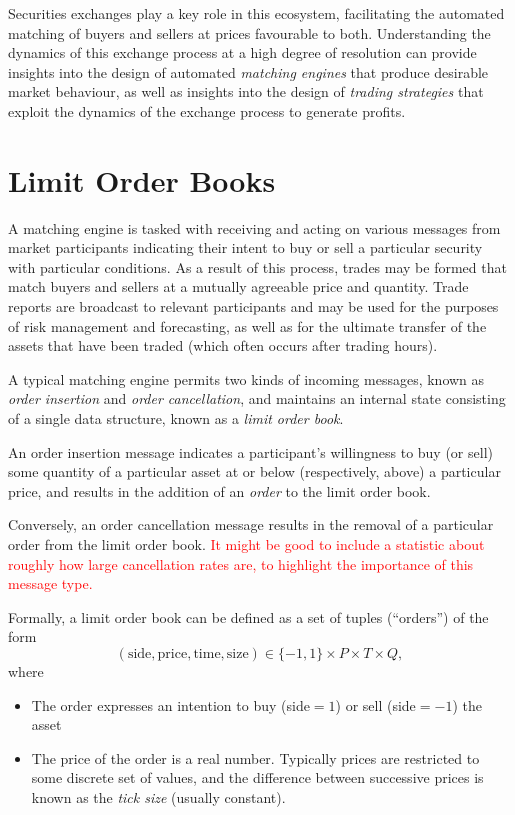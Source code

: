 \documentclass[honours,12pt]{unswthesis}
\numberwithin{equation}{section}
\begin{document}
Securities exchanges play a key role in this ecosystem, facilitating the automated matching of buyers and sellers at prices favourable to both. Understanding the dynamics of this exchange process at a high degree of resolution can provide insights into the design of automated \textit{matching engines} that produce desirable market behaviour, as well as insights into the design of \textit{trading strategies} that exploit the dynamics of the exchange process to generate profits.

\section{Limit Order Books}
A matching engine is tasked with receiving and acting on various messages from market participants indicating their intent to buy or sell a particular security with particular conditions. As a result of this process, trades may be formed that match buyers and sellers at a mutually agreeable price and quantity. Trade reports are broadcast to relevant participants and may be used for the purposes of risk management and forecasting, as well as for the ultimate transfer of the assets that have been traded (which often occurs after trading hours).

\bigskip

A typical matching engine permits two kinds of incoming messages, known as \textit{order insertion} and \textit{order cancellation}, and maintains an internal state consisting of a single data structure, known as a \textit{limit order book}.

\medskip

An order insertion message indicates a participant's willingness to buy (or sell) some quantity of a particular asset at or below (respectively, above) a particular price, and results in the addition of an \textit{order} to the limit order book.

Conversely, an order cancellation message results in the removal of a particular order from the limit order book. \textcolor{red}{It might be good to include a statistic about roughly how large cancellation rates are, to highlight the importance of this message type.}

Formally, a limit order book can be defined as a set of tuples (``orders'') of the form
$$(\text{side},\text{price},\text{time},\text{size})\in \{-1,1\}\times P\times T\times Q,$$
where
\begin{itemize}
	\item The order expresses an intention to buy (side$=1$) or sell (side$=-1$) the asset
	\item The price of the order is a real number. Typically prices are restricted to some discrete set of values, and the difference between successive prices is known as the \textit{tick size} (usually constant).
\end{itemize}
\end{document}
